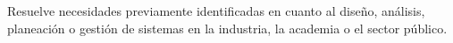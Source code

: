 Resuelve necesidades previamente identificadas en cuanto al dise\~{n}o,
an\'{a}lisis, planeaci\'{o}n o gesti\'{o}n de sistemas en la industria, la
academia o el sector p\'{u}blico.